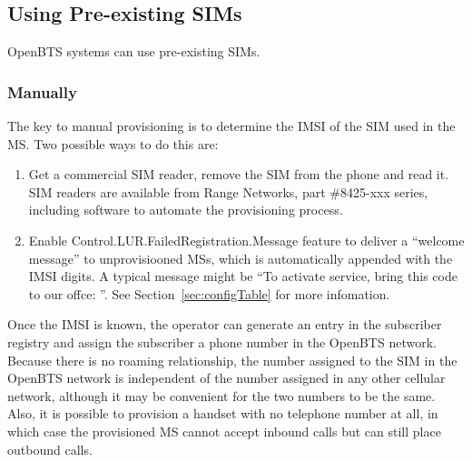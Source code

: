 \documentclass[11pt,openany]{book}
\begin{document}
\subsection{Using Pre-existing SIMs}
OpenBTS systems can use pre-existing SIMs.

\subsubsection{Manually}
The key to manual provisioning is to determine the IMSI of the SIM used in the MS.
Two possible ways to do this are:
\begin{enumerate}
	\item Get a commercial SIM reader, remove the SIM from the phone and read it.  SIM readers are available from Range Networks, part \#8425-xxx series, including software to automate the provisioning process.
	\item Enable Control.LUR.FailedRegistration.Message feature to deliver a ``welcome message'' to unprovisiooned MSs, which is automatically appended with the IMSI digits.  A typical message might be ``To activate service, bring this code to our offce: ''.  See Section~\ref{sec:configTable} for more infomation.
\end{enumerate}

Once the IMSI is known, the operator can generate an entry in the subscriber registry and assign the subscriber a phone number in the OpenBTS network.
Because there is no roaming relationship, the number assigned to the SIM in the OpenBTS network is independent of the number assigned in any other cellular network, although it may be convenient for the two numbers to be the same.
Also, it is possible to provision a handset with no telephone number at all, in which case the provisioned MS cannot accept inbound calls but can still place outbound calls.
\end{document}
